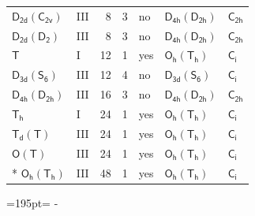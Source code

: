 \documentclass[10pt,a4paper]{article}
\newcommand{\needspace}[1]{\par\penalty-100\begingroup\dimen0=#1\relax\dimen2=\pagegoal
  \advance\dimen2-\pagetotal\ifdim\dimen0>\dimen2\relax\ifdim\dimen2>0pt\vfil\break\fi\fi
  \endgroup}
\numberwithin{equation}{section}
\newcommand{\grp}[1]{\mathsf{#1}}
\begin{document}
{\begin{longtable}{@{}llrrlll@{}}
\href{D2d-C2v.pdf}{$\grp{D_{2d}}(\grp{C_{2v}})$} & III & 8 & 3 & no & \href{D4h-D2h.pdf}{$\grp{D_{4h}}(\grp{D_{2h}})$} & \href{../../../rotation/data/pdf/C2h.pdf}{$\grp{C_{2h}}$}\\
\href{D2d-D2.pdf}{$\grp{D_{2d}}(\grp{D_{2}})$} & III & 8 & 3 & no & \href{D4h-D2h.pdf}{$\grp{D_{4h}}(\grp{D_{2h}})$} & \href{../../../rotation/data/pdf/C2h.pdf}{$\grp{C_{2h}}$}\\
\href{../../../rotation/data/pdf/T.pdf}{$\grp{T}$} & I & 12 & 1 & yes & \href{Oh-Th.pdf}{$\grp{O_{h}}(\grp{T_{h}})$} & \href{../../../rotation/data/pdf/S2.pdf}{$\grp{C_{i}}$}\\
\href{D3d-S6.pdf}{$\grp{D_{3d}}(\grp{S_{6}})$} & III & 12 & 4 & no & \href{D3d-S6.pdf}{$\grp{D_{3d}}(\grp{S_{6}})$} & \href{../../../rotation/data/pdf/S2.pdf}{$\grp{C_{i}}$}\\
\href{D4h-D2h.pdf}{$\grp{D_{4h}}(\grp{D_{2h}})$} & III & 16 & 3 & no & \href{D4h-D2h.pdf}{$\grp{D_{4h}}(\grp{D_{2h}})$} & \href{../../../rotation/data/pdf/C2h.pdf}{$\grp{C_{2h}}$}\\
\href{../../../rotation/data/pdf/Th.pdf}{$\grp{T_{h}}$} & I & 24 & 1 & yes & \href{Oh-Th.pdf}{$\grp{O_{h}}(\grp{T_{h}})$} & \href{../../../rotation/data/pdf/S2.pdf}{$\grp{C_{i}}$}\\
\href{Td-T.pdf}{$\grp{T_{d}}(\grp{T})$} & III & 24 & 1 & yes & \href{Oh-Th.pdf}{$\grp{O_{h}}(\grp{T_{h}})$} & \href{../../../rotation/data/pdf/S2.pdf}{$\grp{C_{i}}$}\\
\href{O-T.pdf}{$\grp{O}(\grp{T})$} & III & 24 & 1 & yes & \href{Oh-Th.pdf}{$\grp{O_{h}}(\grp{T_{h}})$} & \href{../../../rotation/data/pdf/S2.pdf}{$\grp{C_{i}}$}\\*
\href{Oh-Th.pdf}{$\grp{O_{h}}(\grp{T_{h}})$} & III & 48 & 1 & yes & \href{Oh-Th.pdf}{$\grp{O_{h}}(\grp{T_{h}})$} & \href{../../../rotation/data/pdf/S2.pdf}{$\grp{C_{i}}$}\\
\bottomrule\end{longtable}}
\needspace{195pt}
\end{document}
